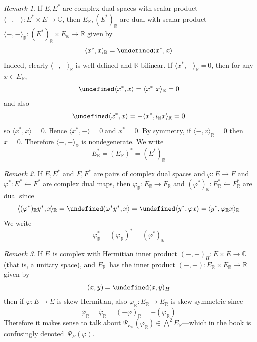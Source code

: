 \documentclass[letterpaper,12pt]{article}
\newcommand{\R}{\mathbb{R}}
\newcommand{\C}{\mathbb{C}}
\newcommand{\from}{\leftarrow}
\let\Re\undefined
\DeclareMathOperator{\Re}{Re}
\let\Im\undefined
\DeclareMathOperator{\Im}{Im}
\newcommand{\sprod}[2]{\langle#1,#2\rangle}
\newcommand{\iprod}[2]{(#1,#2)}
\newcommand{\adj}[1]{\widetilde{#1}}
\newcommand{\ur}[1]{#1_{\R}}
\newcommand{\ir}{\ur{i}}
\theoremstyle{definition}
\theoremstyle{remark}
\newtheorem*{rmk}{Remark}
\begin{document}
\begin{rmk}
If \(E,E^*\) are complex dual spaces with scalar product \(\sprod{-}{-}:E^*\times E\to\C\), then \(\ur{E},\ur{(E^*)}\) are dual with scalar product \(\sprod{-}{-}_{\R}:\ur{(E^*)}\times\ur{E}\to\R\) given by
\[\sprod{x^*}{x}_{\R}=\Re\sprod{x^*}{x}\]
Indeed, clearly \(\sprod{-}{-}_{\R}\) is well-defined and \(\R\)-bilinear. If \(\sprod{x^*}{-}_{\R}=0\), then for any \(x\in\ur{E}\),
\[\Re\sprod{x^*}{x}=\sprod{x^*}{x}_{\R}=0\]
and also
\[\Im\sprod{x^*}{x}=-\sprod{x^*}{\ir x}_{\R}=0\]
so \(\sprod{x^*}{x}=0\). Hence \(\sprod{x^*}{-}=0\) and \(x^*=0\). By symmetry, if \(\sprod{-}{x}_{\R}=0\) then \(x=0\). Therefore \(\sprod{-}{-}_{\R}\) is nondegenerate. We write
\[\ur{E}^*=(\ur{E})^*=\ur{(E^*)}\]
\end{rmk}

\begin{rmk}
If \(E,E^*\) and \(F,F^*\) are pairs of complex dual spaces and \(\varphi:E\to F\) and \(\varphi^*:E^*\from F^*\) are complex dual maps, then \(\ur{\varphi}:\ur{E}\to\ur{F}\) and \(\ur{(\varphi^*)}:\ur{E}^*\from\ur{F}^*\) are dual since
\[\sprod{\ur{(\varphi^*)}y^*}{x}_{\R}=\Re\sprod{\varphi^*y^*}{x}=\Re\sprod{y^*}{\varphi x}=\sprod{y^*}{\ur{\varphi}x}_{\R}\]
We write
\[\ur{\varphi}^*=(\ur{\varphi})^*=\ur{(\varphi^*)}\]
\end{rmk}

\begin{rmk}
If \(E\)~is complex with Hermitian inner product \(\iprod{-}{-}_H:E\times E\to\C\) (that is, a unitary space), and \(\ur{E}\)~has the inner product \(\iprod{-}{-}:\ur{E}\times\ur{E}\to\R\) given by
\[\iprod{x}{y}=\Re\iprod{x}{y}_H\]
then if \(\varphi:E\to E\) is skew-Hermitian, also \(\ur{\varphi}:\ur{E}\to\ur{E}\) is skew-symmetric since
\[\adj{\ur{\varphi}}=\ur{\adj{\varphi}}=\ur{(-\varphi)}=-(\ur{\varphi})\]
Therefore it makes sense to talk about \(\Psi_{\ur{E}}(\ur{\varphi})\in\bigwedge^2\ur{E}\)---which in the book is confusingly denoted~\(\Psi_E(\varphi)\).
\end{rmk}
\end{document}
